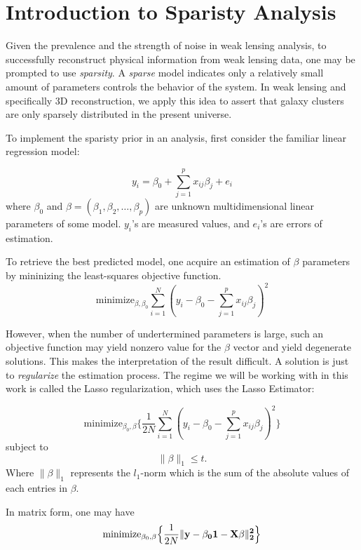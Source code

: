 \section{Introduction to Sparisty Analysis}

Given the prevalence and the strength of noise in weak lensing analysis, to successfully reconstruct physical information from weak lensing data, one may be prompted to use \emph{sparsity}. A \emph{sparse} model indicates only a relatively small amount of parameters controls
the behavior of the system. In weak lensing and specifically 3D reconstruction, we apply this idea to assert that galaxy clusters are only sparsely 
distributed in the present universe. 

To implement the sparisty prior in an analysis, first consider the familiar linear regression model: 

\begin{equation}
  y_i = \beta_0 + \sum^{p}_{j=1} x_{ij}\beta_j + e_i
\end{equation}
where $\beta_0$ and $\beta = (\beta_1, \beta_2, \ldots, \beta_p)$ are unknown multidimensional linear parameters of some model. $y_i$'s are measured values, and $e_i$'s are errors of estimation.

To retrieve the best predicted model, one acquire an estimation of $\beta$ parameters by mininizing the least-squares objective function. 
\begin{equation}
  \mathrm{minimize}_{\beta, \beta_0} \sum^N_{i=1}(y_i - \beta_0 - \sum^{p}_{j=1}x_{ij}\beta_j)^2
\end{equation}

However, when the number of undertermined parameters is large, such an objective function may yield nonzero value for the $\beta$ vector and yield degenerate solutions. This makes the interpretation of the result difficult. 
A solution is just to \emph{regularize} the estimation process. The regime we will be working with in this work is called the Lasso regularization, which uses the Lasso Estimator:

\begin{equation}
  \mathrm{minimize}_{\beta_0, \beta}\{\frac{1}{2N} \sum^N_{i=1}(y_i-\beta_0 - \sum^{p}_{j=1}x_{ij}\beta_j)^2\}
\end{equation}
subject to 
\[\lVert \beta \lVert_1\leq t.\]
Where $\lVert \beta \lVert_1$ represents the $l_1$-norm which is the sum of the absolute values of each entries in $\beta$. 

In matrix form, one may have
\begin{equation}
  \mathrm{minimize}_{\beta_0, \beta}\Bigl\{\frac{1}{2N} \lVert \bf{y} - \beta_0 \bf{1} - \bf{X}\beta\lVert^2_2\Bigl\}
\end{equation}

